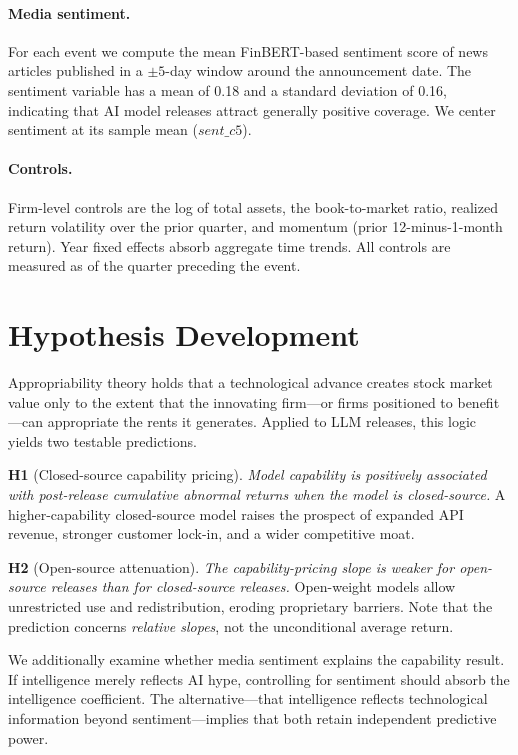 \documentclass[12pt]{article}
\begin{document}
\paragraph{Media sentiment.}
For each event we compute the mean FinBERT-based sentiment score of news articles
published in a $\pm 5$-day window around the announcement date. The sentiment
variable has a mean of 0.18 and a standard deviation of 0.16, indicating that AI
model releases attract generally positive coverage. We center sentiment at its
sample mean ($\textit{sent\_c5}$).

\paragraph{Controls.}
Firm-level controls are the log of total assets, the book-to-market ratio,
realized return volatility over the prior quarter, and momentum (prior
12-minus-1-month return). Year fixed effects absorb aggregate time trends. All
controls are measured as of the quarter preceding the event.

\section{Hypothesis Development}
\label{sec:hyp}

Appropriability theory \citep{Teece1986} holds that a technological advance
creates stock market value only to the extent that the innovating firm---or firms
positioned to benefit---can appropriate the rents it generates. Applied to LLM
releases, this logic yields two testable predictions.

\medskip
\noindent\textbf{H1} (Closed-source capability pricing). \textit{Model capability
is positively associated with post-release cumulative abnormal returns when the
model is closed-source.} A higher-capability closed-source model raises the
prospect of expanded API revenue, stronger customer lock-in, and a wider
competitive moat.

\medskip
\noindent\textbf{H2} (Open-source attenuation). \textit{The capability-pricing
slope is weaker for open-source releases than for closed-source releases.}
Open-weight models allow unrestricted use and redistribution, eroding proprietary
barriers. Note that the prediction concerns \emph{relative slopes}, not the
unconditional average return.

\medskip
We additionally examine whether media sentiment explains the capability result.
If intelligence merely reflects AI hype, controlling for sentiment should absorb
the intelligence coefficient. The alternative---that intelligence reflects
technological information beyond sentiment---implies that both retain independent
predictive power.
\end{document}

